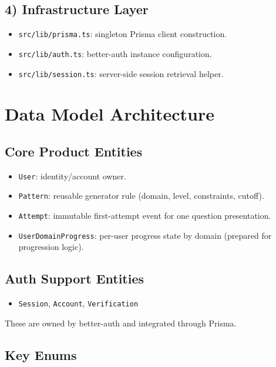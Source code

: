 \documentclass[11pt]{article}
\begin{document}
\subsection*{4) Infrastructure Layer}

\begin{itemize}[leftmargin=*]
	\item \texttt{src/lib/prisma.ts}: singleton Prisma client construction.
	\item \texttt{src/lib/auth.ts}: better-auth instance configuration.
	\item \texttt{src/lib/session.ts}: server-side session retrieval helper.
\end{itemize}

\section{Data Model Architecture}

\subsection*{Core Product Entities}

\begin{itemize}[leftmargin=*]
	\item \texttt{User}: identity/account owner.
	\item \texttt{Pattern}: reusable generator rule (domain, level, constraints, cutoff).
	\item \texttt{Attempt}: immutable first-attempt event for one question presentation.
	\item \texttt{UserDomainProgress}: per-user progress state by domain (prepared for progression logic).
\end{itemize}

\subsection*{Auth Support Entities}

\begin{itemize}[leftmargin=*]
	\item \texttt{Session}, \texttt{Account}, \texttt{Verification}
\end{itemize}

These are owned by better-auth and integrated through Prisma.

\subsection*{Key Enums}
\end{document}
